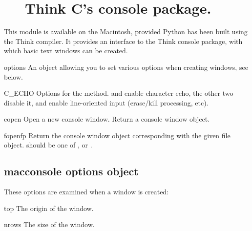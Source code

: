 \section{ ---
         Think C's console package.}




This module is available on the Macintosh, provided Python has been
built using the Think \C{} compiler. It provides an interface to the
Think console package, with which basic text windows can be created.

\begin{datadesc}{options}
An object allowing you to set various options when creating windows,
see below.
\end{datadesc}

\begin{datadesc}{C_ECHO}
Options for the  method.  and
 enable character echo, the other two disable it,
 and  enable line-oriented input
(erase/kill processing, etc).
\end{datadesc}

\begin{funcdesc}{copen}{}
Open a new console window. Return a console window object.
\end{funcdesc}

\begin{funcdesc}{fopen}{fp}
Return the console window object corresponding with the given file
object.  should be one of ,  or
.
\end{funcdesc}

\subsection{macconsole options object}
These options are examined when a window is created:

\begin{datadesc}{top}
The origin of the window.
\end{datadesc}

\begin{datadesc}{nrows}
The size of the window.
\end{datadesc}

